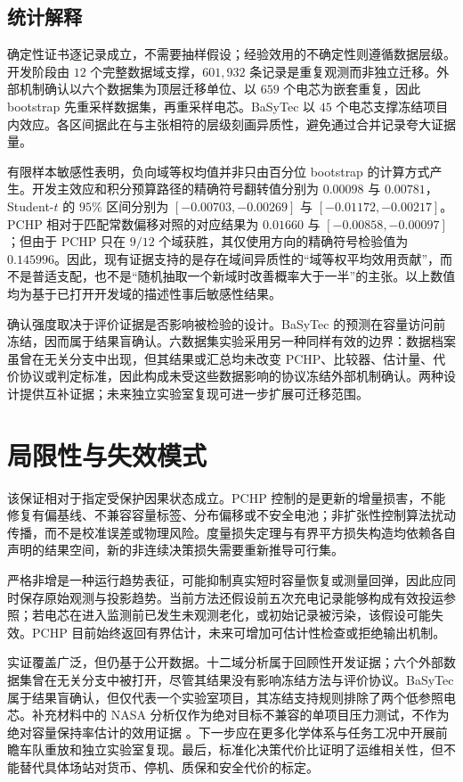 \documentclass[UTF8,11pt]{ctexart}
\begin{document}
\subsection{统计解释}

确定性证书逐记录成立，不需要抽样假设；经验效用的不确定性则遵循数据层级。开发阶段由 $12$ 个完整数据域支撑，$601{,}932$ 条记录是重复观测而非独立迁移。外部机制确认以六个数据集为顶层迁移单位、以 $659$ 个电芯为嵌套重复，因此 bootstrap 先重采样数据集，再重采样电芯。BaSyTec 以 $45$ 个电芯支撑冻结项目内效应。各区间据此在与主张相符的层级刻画异质性，避免通过合并记录夸大证据量。

有限样本敏感性表明，负向域等权均值并非只由百分位 bootstrap 的计算方式产生。开发主效应和积分预算路径的精确符号翻转值分别为 $0.00098$ 与 $0.00781$，Student-$t$ 的 $95\%$ 区间分别为 $[-0.00703,-0.00269]$ 与 $[-0.01172,-0.00217]$。PCHP 相对于匹配常数偏移对照的对应结果为 $0.01660$ 与 $[-0.00858,-0.00097]$；但由于 PCHP 只在 $9/12$ 个域获胜，其仅使用方向的精确符号检验值为 $0.145996$。因此，现有证据支持的是存在域间异质性的“域等权平均效用贡献”，而不是普适支配，也不是“随机抽取一个新域时改善概率大于一半”的主张。以上数值均为基于已打开开发域的描述性事后敏感性结果。

确认强度取决于评价证据是否影响被检验的设计。BaSyTec 的预测在容量访问前冻结，因而属于结果盲确认。六数据集实验采用另一种同样有效的边界：数据档案虽曾在无关分支中出现，但其结果或汇总均未改变 PCHP、比较器、估计量、代价协议或判定标准，因此构成未受这些数据影响的协议冻结外部机制确认。两种设计提供互补证据；未来独立实验室复现可进一步扩展可迁移范围。

\section{局限性与失效模式}

该保证相对于指定受保护因果状态成立。PCHP 控制的是更新的增量损害，不能修复有偏基线、不兼容容量标签、分布偏移或不安全电池；非扩张性控制算法扰动传播，而不是校准误差或物理风险。度量损失定理与有界平方损失构造均依赖各自声明的结果空间，新的非连续决策损失需要重新推导可行集。

严格非增是一种运行趋势表征，可能抑制真实短时容量恢复或测量回弹，因此应同时保存原始观测与投影趋势。当前方法还假设前五次充电记录能够构成有效投运参照；若电芯在进入监测前已发生未观测老化，或初始记录被污染，该假设可能失效。PCHP 目前始终返回有界估计，未来可增加可估计性检查或拒绝输出机制。

实证覆盖广泛，但仍基于公开数据。十二域分析属于回顾性开发证据；六个外部数据集曾在无关分支中被打开，尽管其结果没有影响冻结方法与评价协议。BaSyTec 属于结果盲确认，但仅代表一个实验室项目，其冻结支持规则排除了两个低参照电芯。补充材料中的 NASA 分析仅作为绝对目标不兼容的单项目压力测试，不作为绝对容量保持率估计的效用证据 \citep{saha2007nasa}。下一步应在更多化学体系与任务工况中开展前瞻车队重放和独立实验室复现。最后，标准化决策代价比证明了运维相关性，但不能替代具体场站对货币、停机、质保和安全代价的标定。
\end{document}

